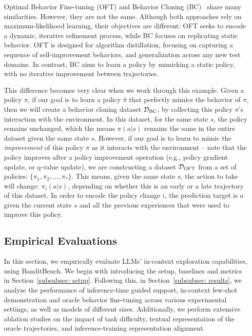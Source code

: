 Optimal Behavior Fine-tuning (OFT) and Behavior Cloning (BC)~\citep{pomerleau1991efficient} share many similarities. However, they are not the same. Although both approaches rely on maximum-likelihood learning, their objectives are different: OFT seeks to encode a dynamic, iterative refinement process, while BC focuses on replicating static behavior. OFT is designed for algorithm distillation, focusing on capturing a sequence of self-improvement behaviors, and generalization across any new test domains. In contrast, BC aims to learn a policy by mimicking a static policy, with no iterative improvement between trajectories.

This difference becomes very clear when we work through this example. Given a policy $\pi$, if our goal is to learn a policy $\hat \pi$ that perfectly mimics the behavior of $\pi$, then we will create a behavior cloning dataset ${\mathcal{D}}_{\text{BC}}$, by collecting this policy $\pi$'s interaction with the environment. In this dataset, for the same state $s$, the policy remains unchanged, which the means $\pi(a|s)$ remains the same in the entire dataset given the same state $s$. However, if our goal is to learn to mimic the \textit{improvement} of this policy $\pi$ as it interacts with the environment -- note that the policy improves after a policy improvement operation (e.g., policy gradient update, or q-value update), we are constructing a dataset ${\mathcal{D}}_{\text{OFT}}$ from a set of policies: $\{\pi_1, \pi_2, ..., \pi_{*}\}$. This means, given the same state $s$, the action to take will change: $\pi_i(a|s)$, depending on whether this is an early or a late trajectory of this dataset. In order to encode the policy change $i$, the prediction target is $a$ given the current state $s$ and all the previous experiences that were used to improve this policy.


\subsection{Empirical Evaluations}
\label{subsec: eval_and_baselines}
In this section, we empirically evaluate LLMs' in-context exploration capabilities, using BanditBench. We begin with introducing the setup, baselines and metrics in Section~\ref{subsubsec: setup}. Following this, in Section~\ref{subsubsec: results}, we analyze the performance of inference-time guided support, in-context few-shot demonstration and oracle behavior fine-tuning across various experimental settings, as well as models of different sizes. Additionally, we perform extensive ablation studies on the impact of task difficulty, textual representation of the oracle trajectories, and inference-training representation alignment.
